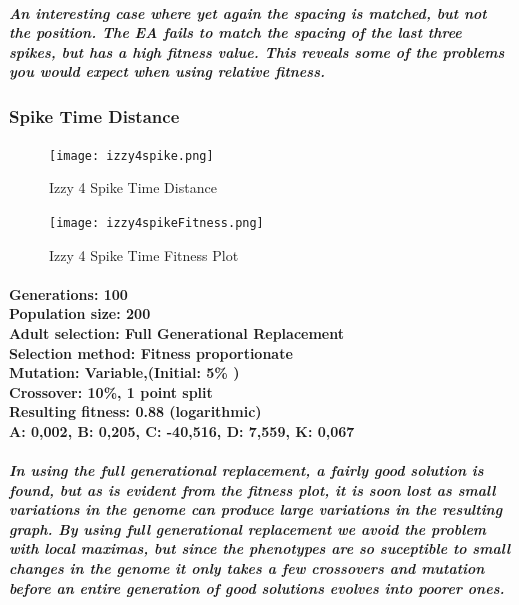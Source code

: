 \documentclass[titlepage,norsk]{article}
\begin{document}
\subparagraph{An interesting case where yet again the spacing is matched, but not the position. The EA fails to match the spacing of the last three spikes, but has a high fitness value. This reveals some of the problems you would expect when using relative fitness.  }

\subsubsection{Spike Time  Distance}

\begin{figure}[h!]
\centering
\texttt{[image: izzy4spike.png]}
\caption{Izzy 4 Spike Time Distance}
\label{fig:awesome_image}
\end{figure}

\begin{figure}[h!]
\centering
\texttt{[image: izzy4spikeFitness.png]}
\caption{Izzy 4 Spike Time Fitness Plot}
\label{fig:awesome_image}
\end{figure}

\paragraph{
Generations: 100\\
Population size: 200\\
Adult selection: Full Generational Replacement \\
Selection method: Fitness proportionate\\
Mutation: Variable,(Initial:  5\% )\\
Crossover: 10\%, 1 point split \\
Resulting fitness: 0.88 (logarithmic) \\
 A: 0,002, B: 0,205, C: -40,516, D: 7,559, K: 0,067  \\
}

\subparagraph{In using the full generational replacement, a fairly good solution is found, but as is evident from the fitness plot, it is soon lost as small variations in the genome can produce large variations in the resulting graph. By using full generational replacement we avoid the problem with local maximas, but since the phenotypes are so suceptible to small changes in the genome it only takes a few crossovers and mutation before an entire generation of good solutions evolves into poorer ones.
}

\end{document}
